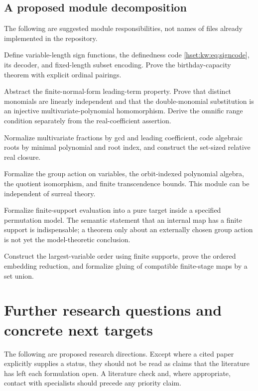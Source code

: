 \documentclass[11pt,letterpaper]{article}
\theoremstyle{definition}
\theoremstyle{remark}
\begin{document}
\subsection{A proposed module decomposition}
The following are suggested module responsibilities, not names of files already implemented in the repository.
\begin{description}[style=nextline,leftmargin=0pt,labelsep=0pt]
\item[OrdinalSignCoding]
Define variable-length sign functions, the definedness code \eqref{hset:kw:eq:signcode}, its decoder, and fixed-length subset encoding. Prove the birthday-capacity theorem with explicit ordinal pairings.
\item[DoubleMonomialIndependence]
Abstract the finite-normal-form leading-term property. Prove that distinct monomials are linearly independent and that the double-monomial substitution is an injective multivariate-polynomial homomorphism. Derive the omnific range condition separately from the real-coefficient assertion.
\item[CanonicalFieldCodes]
Normalize multivariate fractions by gcd and leading coefficient, code algebraic roots by minimal polynomial and root index, and construct the set-sized relative real closure.
\item[OrbitPolynomialQuotient]
Formalize the group action on variables, the orbit-indexed polynomial algebra, the quotient isomorphism, and finite transcendence bounds. This module can be independent of surreal theory.
\item[InternalSymmetryBridge]
Formalize finite-support evaluation into a pure target inside a specified permutation model. The semantic statement that an internal map has a finite support is indispensable; a theorem only about an externally chosen group action is not yet the model-theoretic conclusion.
\item[OrderedFreeFieldAndCoherence]
Construct the largest-variable order using finite supports, prove the ordered embedding reduction, and formalize gluing of compatible finite-stage maps by a set union.
\end{description}

\section{Further research questions and concrete next targets}
\label{hset:kw:sec:questions}

The following are proposed research directions. Except where a cited paper explicitly supplies a status, they should not be read as claims that the literature has left each formulation open. A literature check and, where appropriate, contact with specialists should precede any priority claim.
\end{document}
